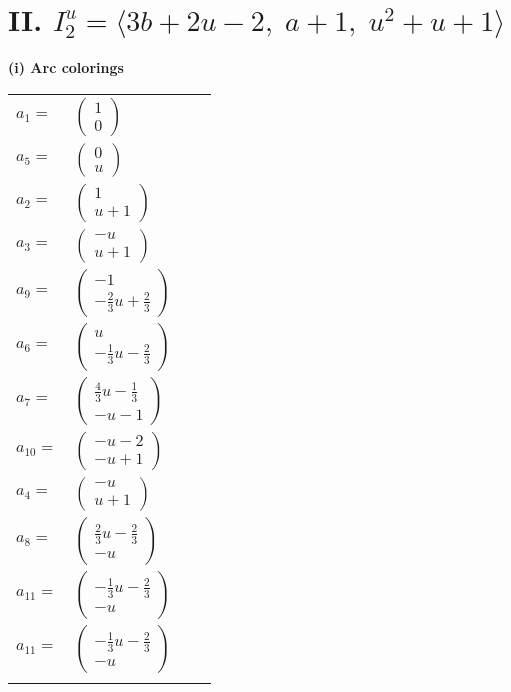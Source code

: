 \documentclass[1p]{elsarticle_modified}
\theoremstyle{definition}
\begin{document}
\centering \section*{II. $I^u_{2}= \langle 3 b+2 u-2,\;a+1,\;u^2+u+1 \rangle$}
\flushleft \textbf{(i) Arc colorings}\\
\begin{tabular}{m{7pt} m{180pt} m{7pt} m{180pt} }
\flushright $a_{1}=$&$\begin{pmatrix}1\\0\end{pmatrix}$ \\
\flushright $a_{5}=$&$\begin{pmatrix}0\\u\end{pmatrix}$ \\
\flushright $a_{2}=$&$\begin{pmatrix}1\\u+1\end{pmatrix}$ \\
\flushright $a_{3}=$&$\begin{pmatrix}- u\\u+1\end{pmatrix}$ \\
\flushright $a_{9}=$&$\begin{pmatrix}-1\\-\frac{2}{3} u+\frac{2}{3}\end{pmatrix}$ \\
\flushright $a_{6}=$&$\begin{pmatrix}u\\-\frac{1}{3} u-\frac{2}{3}\end{pmatrix}$ \\
\flushright $a_{7}=$&$\begin{pmatrix}\frac{4}{3} u-\frac{1}{3}\\- u-1\end{pmatrix}$ \\
\flushright $a_{10}=$&$\begin{pmatrix}- u-2\\- u+1\end{pmatrix}$ \\
\flushright $a_{4}=$&$\begin{pmatrix}- u\\u+1\end{pmatrix}$ \\
\flushright $a_{8}=$&$\begin{pmatrix}\frac{2}{3} u-\frac{2}{3}\\- u\end{pmatrix}$ \\
\flushright $a_{11}=$&$\begin{pmatrix}-\frac{1}{3} u-\frac{2}{3}\\- u\end{pmatrix}$\\ \flushright $a_{11}=$&$\begin{pmatrix}-\frac{1}{3} u-\frac{2}{3}\\- u\end{pmatrix}$\\&\end{tabular}
\end{document}
